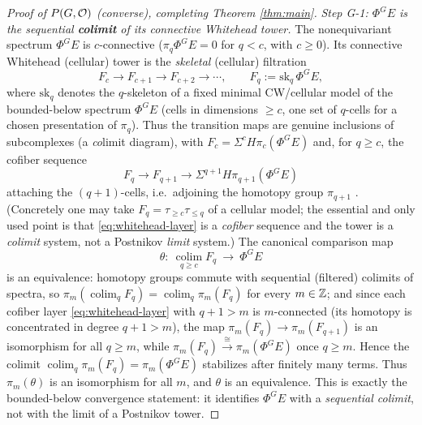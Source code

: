 \begin{proof}[Proof of $P(G,\mathcal{O})$ (converse), completing Theorem \ref{thm:main}]
\emph{Step G-1: $\Phi^G E$ is the sequential \textbf{colimit} of its connective
Whitehead tower.} The nonequivariant spectrum $\Phi^G E$ is $c$-connective
($\pi_q\Phi^G E=0$ for $q<c$, with $c\ge0$). Its connective Whitehead (cellular)
tower is the \emph{skeletal} (cellular) filtration
\[
F_c\longrightarrow F_{c+1}\longrightarrow F_{c+2}\longrightarrow\cdots,
\qquad F_q:=\mathrm{sk}_q\,\Phi^G E,
\]
where $\mathrm{sk}_q$ denotes the $q$-skeleton of a fixed minimal CW/cellular
model of the bounded-below spectrum $\Phi^G E$ (cells in dimensions $\ge c$, one
set of $q$-cells for a chosen presentation of $\pi_q$). Thus the transition maps
are genuine inclusions of subcomplexes (a \emph{co}limit diagram), with
$F_c=\Sigma^c H\pi_c(\Phi^G E)$ and, for $q\ge c$, the cofiber sequence
\begin{equation}\label{eq:whitehead-layer}
F_q\longrightarrow F_{q+1}\longrightarrow \Sigma^{q+1}H\pi_{q+1}(\Phi^G E)
\end{equation}
attaching the $(q+1)$-cells, i.e.\ adjoining the homotopy group $\pi_{q+1}$
\cite[\S2]{HillPrimer}. (Concretely one may take $F_q=\tau_{\ge c}\tau_{\le q}$
of a cellular model; the essential and only used point is that
\eqref{eq:whitehead-layer} is a \emph{cofiber} sequence and the tower is a
\emph{colimit} system, not a Postnikov \emph{limit} system.) The canonical comparison map
\[
\theta:\ \operatorname*{colim}_{q\ge c} F_q\ \longrightarrow\ \Phi^G E
\]
is an equivalence: homotopy groups commute with sequential (filtered) colimits
of spectra, so $\pi_m(\operatorname*{colim}_q F_q)=\operatorname*{colim}_q\pi_m(F_q)$
for every $m\in\mathbb{Z}$; and since each cofiber layer \eqref{eq:whitehead-layer}
with $q+1>m$ is $m$-connected (its homotopy is concentrated in degree $q+1>m$),
the map $\pi_m(F_q)\to\pi_m(F_{q+1})$ is an isomorphism for all $q\ge m$, while
$\pi_m(F_q)\xrightarrow{\ \cong\ }\pi_m(\Phi^G E)$ once $q\ge m$. Hence the colimit
$\operatorname*{colim}_q\pi_m(F_q)=\pi_m(\Phi^G E)$ stabilizes after finitely many
terms. Thus $\pi_m(\theta)$ is an isomorphism for all $m$, and $\theta$ is an
equivalence. This is exactly the bounded-below convergence statement: it
identifies $\Phi^G E$ with a \emph{sequential colimit}, not with the limit of a
Postnikov tower.


\end{proof}
